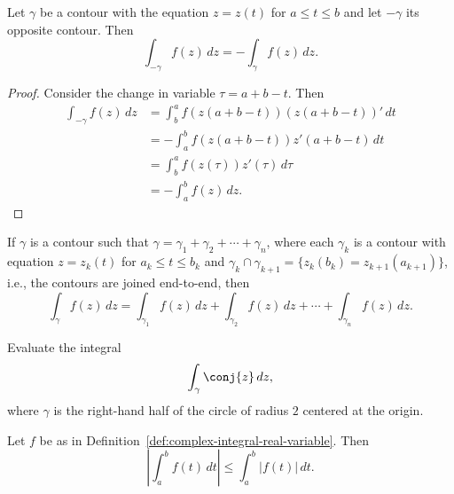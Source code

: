 \begin{theorem}
    Let \(\gamma\) be a contour with the equation \(z = z(t)\) for \(a \leq t \leq b\) and let \(-\gamma\) its opposite contour. Then
    \[
        \int_{-\gamma} f(z) \, dz = -\int_\gamma f(z) \, dz.
    \]
    \label{thm:opposite-contour}
\end{theorem}

\begin{proof}
    Consider the change in variable \(\tau = a + b - t\). Then
    \begin{align*}
        \int_{-\gamma} f(z) \, dz &= \int_{b}^{a} f(z(a + b - t)) (z(a + b - t))' \, dt \\
        &= -\int_{a}^{b} f(z(a + b - t)) z'(a + b - t) \, dt \\
        &= \int_b^a f(z(\tau)) z'(\tau) \, d\tau \\
        &= -\int_a^b f(z) \, dz.
    \end{align*}
\end{proof}

\begin{theorem}
    If \(\gamma\) is a contour such that \(\gamma = \gamma_1 + \gamma_2 + \cdots + \gamma_n\), where each \(\gamma_k\) is a contour with equation \(z = z_k(t)\) for \(a_k \leq t \leq b_k\) and \(\gamma_k \cap \gamma_{k+1} = \{z_k(b_k) = z_{k+1}(a_{k+1})\}\), i.e., the contours are joined end-to-end, then
    \[
        \int_\gamma f(z) \, dz = \int_{\gamma_1} f(z) \, dz + \int_{\gamma_2} f(z) \, dz + \cdots + \int_{\gamma_n} f(z) \, dz.
    \]
\end{theorem}

\begin{example}
    Evaluate the integral
    \[
        \int_{\gamma} \conj{z} \, dz,
    \]
    where \(\gamma\) is the right-hand half of the circle of radius \(2\) centered at the origin.
\end{example}


\begin{theorem}
    Let \(f\) be as in Definition~\ref{def:complex-integral-real-variable}. Then
    \[
        \left| \int_a^b f(t) \, dt \right| \leq \int_a^b |f(t)| \, dt.
    \]
    \label{thm:modulus-integral-inequality}
\end{theorem}

